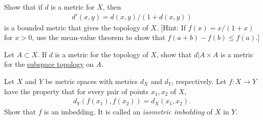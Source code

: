   \begin{exercise}[Munkres 20.11]
    Show that if $d$ is a metric for $X$, then
    \begin{align*}
      d'(x, y) = d(x, y)/(1 + d(x, y))
    \end{align*}
    is a bounded metric that gives the topology of $X$. [Hint: If $f(x) = x/(1 + x)$ for $x > 0$, use the mean-value theorem to show that $f(a + b) - f(b) \leq f(a)$.]
  \end{exercise}

  \begin{exercise}[Munkres 21.1]
    Let $A \subset X$. If $d$ is a metric for the topology of $X$, show that $d|A \times A$ is a metric for the \hyperref[def:subspace-topology]{subspace topology} on $A$.
  \end{exercise}

  \begin{exercise}[Munkres 21.2]
    Let $X$ and $Y$ be metric spaces with metrics $d_X$ and $d_Y$, respectively. Let $f : X \to Y$ have the property that for every pair of points $x_1, x_2$ of $X$,
    \begin{align*}
      d_Y(f(x_1), f(x_2)) = d_X(x_1, x_2).
    \end{align*}
    Show that $f$ is an imbedding. It is called an \textit{isometric imbedding} of $X$ in $Y$.
  \end{exercise}

